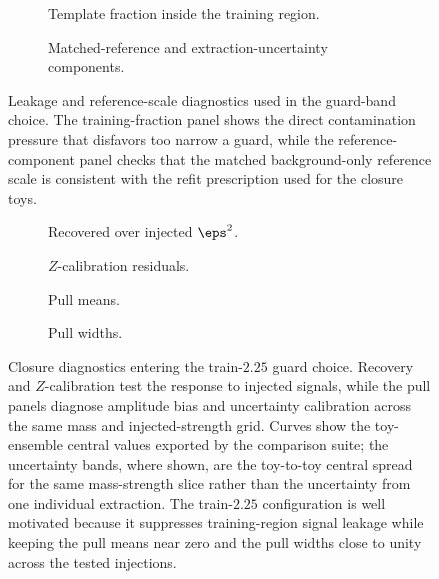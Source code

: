 \begin{figure}[H]
\centering
\begin{subfigure}[t]{0.78\linewidth}
  \centering
  \caption{Template fraction inside the training region.}
\end{subfigure}

\vspace{0.8em}

\begin{subfigure}[t]{0.78\linewidth}
  \centering
  \caption{Matched-reference and extraction-uncertainty components.}
\end{subfigure}
\caption{Leakage and reference-scale diagnostics used in the guard-band choice. The training-fraction panel shows the direct contamination pressure that disfavors too narrow a guard, while the reference-component panel checks that the matched background-only reference scale is consistent with the refit prescription used for the closure toys.}
\label{fig:guard-band-leakage-reference}
\end{figure}

\begin{figure}[H]
\centering
\begin{subfigure}[t]{0.49\linewidth}
  \centering
  \caption{Recovered over injected $\eps^2$.}
\end{subfigure}
\hfill
\begin{subfigure}[t]{0.49\linewidth}
  \centering
  \caption{$Z$-calibration residuals.}
\end{subfigure}

\vspace{0.6em}

\begin{subfigure}[t]{0.49\linewidth}
  \centering
  \caption{Pull means.}
\end{subfigure}
\hfill
\begin{subfigure}[t]{0.49\linewidth}
  \centering
  \caption{Pull widths.}
\end{subfigure}
\caption{Closure diagnostics entering the train-$2.25$ guard choice. Recovery and $Z$-calibration test the response to injected signals, while the pull panels diagnose amplitude bias and uncertainty calibration across the same mass and injected-strength grid. Curves show the toy-ensemble central values exported by the comparison suite; the uncertainty bands, where shown, are the toy-to-toy central spread for the same mass-strength slice rather than the uncertainty from one individual extraction. The train-$2.25$ configuration is well motivated because it suppresses training-region signal leakage while keeping the pull means near zero and the pull widths close to unity across the tested injections.}
\label{fig:guard-band-closure-diagnostics}
\end{figure}


